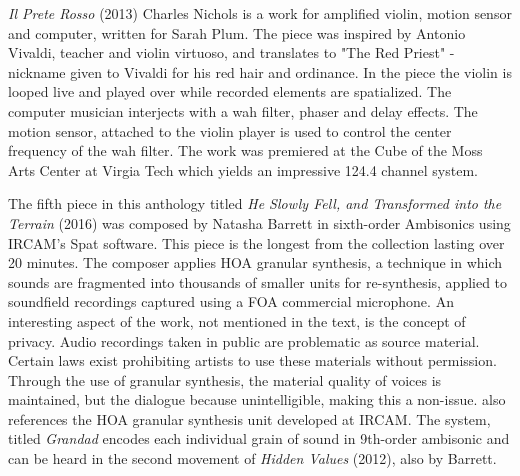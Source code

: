 \textit{Il Prete Rosso} (2013) Charles Nichols is a work for amplified violin, motion sensor and computer, written for Sarah Plum. The piece was inspired by Antonio Vivaldi, teacher and violin virtuoso, and translates to "The Red Priest" - nickname given to Vivaldi for his red hair and ordinance. In the piece the violin is looped live and played over while recorded elements are spatialized. The computer musician interjects with a wah filter, phaser and delay effects. The motion sensor, attached to the violin player is used to control the center frequency of the wah filter. The work was premiered at the Cube of the Moss Arts Center at Virgia Tech which yields an impressive 124.4 channel system.

The fifth piece in this anthology titled \textit{He Slowly Fell, and Transformed into the Terrain} (2016) was composed by Natasha Barrett in sixth-order Ambisonics using IRCAM's Spat software. This piece is the longest from the collection lasting over 20 minutes. The composer applies HOA granular synthesis, a technique in which sounds are fragmented into thousands of smaller units for re-synthesis, applied to soundfield recordings captured using a FOA commercial microphone. An interesting aspect of the work, not mentioned in the text, is the concept of privacy. Audio recordings taken in public are problematic as source material. Certain laws exist prohibiting artists to use these materials without permission. Through the use of granular synthesis, the material quality of voices is maintained, but the dialogue because unintelligible, making this a non-issue. \cite{barrett2016musical} also references the HOA granular synthesis unit developed at IRCAM. The system, titled \textit{Grandad} encodes each individual grain of sound in 9th-order ambisonic and can be heard in the second movement of \textit{Hidden Values} (2012), also by Barrett. 

